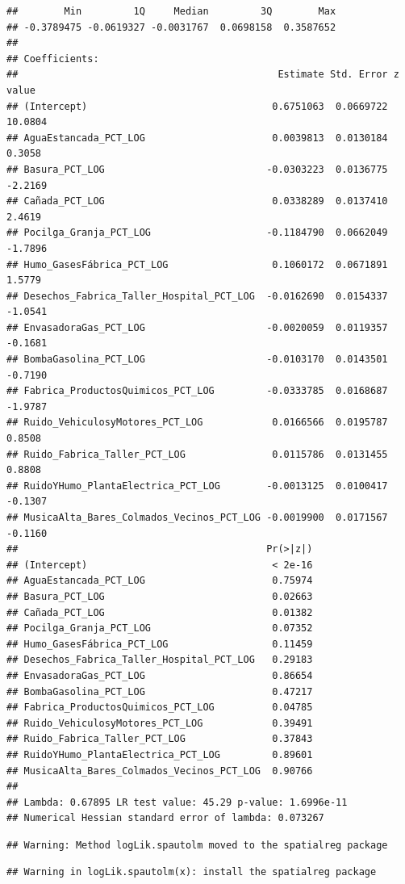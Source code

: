 \documentclass[11pt,]{article}
\begin{document}
\begin{verbatim}
##        Min         1Q     Median         3Q        Max 
## -0.3789475 -0.0619327 -0.0031767  0.0698158  0.3587652 
## 
## Coefficients: 
##                                             Estimate Std. Error z value
## (Intercept)                                0.6751063  0.0669722 10.0804
## AguaEstancada_PCT_LOG                      0.0039813  0.0130184  0.3058
## Basura_PCT_LOG                            -0.0303223  0.0136775 -2.2169
## Cañada_PCT_LOG                             0.0338289  0.0137410  2.4619
## Pocilga_Granja_PCT_LOG                    -0.1184790  0.0662049 -1.7896
## Humo_GasesFábrica_PCT_LOG                  0.1060172  0.0671891  1.5779
## Desechos_Fabrica_Taller_Hospital_PCT_LOG  -0.0162690  0.0154337 -1.0541
## EnvasadoraGas_PCT_LOG                     -0.0020059  0.0119357 -0.1681
## BombaGasolina_PCT_LOG                     -0.0103170  0.0143501 -0.7190
## Fabrica_ProductosQuimicos_PCT_LOG         -0.0333785  0.0168687 -1.9787
## Ruido_VehiculosyMotores_PCT_LOG            0.0166566  0.0195787  0.8508
## Ruido_Fabrica_Taller_PCT_LOG               0.0115786  0.0131455  0.8808
## RuidoYHumo_PlantaElectrica_PCT_LOG        -0.0013125  0.0100417 -0.1307
## MusicaAlta_Bares_Colmados_Vecinos_PCT_LOG -0.0019900  0.0171567 -0.1160
##                                           Pr(>|z|)
## (Intercept)                                < 2e-16
## AguaEstancada_PCT_LOG                      0.75974
## Basura_PCT_LOG                             0.02663
## Cañada_PCT_LOG                             0.01382
## Pocilga_Granja_PCT_LOG                     0.07352
## Humo_GasesFábrica_PCT_LOG                  0.11459
## Desechos_Fabrica_Taller_Hospital_PCT_LOG   0.29183
## EnvasadoraGas_PCT_LOG                      0.86654
## BombaGasolina_PCT_LOG                      0.47217
## Fabrica_ProductosQuimicos_PCT_LOG          0.04785
## Ruido_VehiculosyMotores_PCT_LOG            0.39491
## Ruido_Fabrica_Taller_PCT_LOG               0.37843
## RuidoYHumo_PlantaElectrica_PCT_LOG         0.89601
## MusicaAlta_Bares_Colmados_Vecinos_PCT_LOG  0.90766
## 
## Lambda: 0.67895 LR test value: 45.29 p-value: 1.6996e-11 
## Numerical Hessian standard error of lambda: 0.073267
\end{verbatim}

\begin{verbatim}
## Warning: Method logLik.spautolm moved to the spatialreg package
\end{verbatim}

\begin{verbatim}
## Warning in logLik.spautolm(x): install the spatialreg package
\end{verbatim}
\end{document}
